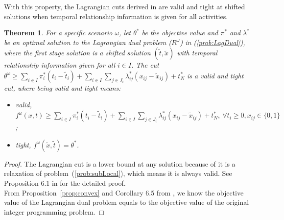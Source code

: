\documentclass[11pt]{article}
\newtheorem{theorem}{Theorem}
\newcommand{\noi}{\noindent}
\begin{document}
	\noi With this property, the Lagrangian cuts derived in \cite{zou2016nested} are valid and tight at shifted solutions when temporal relationship information is given for all activities.
	\begin{theorem}
		For a specific scenario \(\omega\), let \(\theta^*\) be the objective value and \(\pi^*\) and \(\lambda^*\) be an optimal solution to the Lagrangian dual problem (\(R^\omega\)) in (\ref{prob:LagDual}), where the first stage solution is a shifted solution \((\tilde{t},\tilde{x})\) with temporal relationship information given for all \(i \in I\). The cut \(\theta^\omega \geq \sum_{i \in I} \pi_i^* (t_i - \tilde{t}_i) + \sum_{i \in I} \sum_{j \in J_i} \lambda_{ij}^* (x_{ij} - \tilde{x}_{ij}) + t_N^*\) is a valid and tight cut, where being valid and tight means:
		\begin{itemize}
			\item valid, \(f^\omega(x,t) \geq \sum_{i \in I} \pi_i^* (t_i - \tilde{t}_i) + \sum_{i \in I} \sum_{j \in J_i} \lambda_{ij}^* (x_{ij} - \tilde{x}_{ij}) + t_N^*,\ \forall t_i \geq 0, x_{ij} \in \{0,1\}\);
			\item tight, \(f^\omega(\tilde{x},\tilde{t}) = \theta^*\).
		\end{itemize} 
	\end{theorem}
	\begin{proof}
		The Lagrangian cut is a lower bound at any solution because of it is a relaxation of problem~(\ref{prob:subLocal}), which means it is always valid. See Proposition 6.1 in \cite{nemhauser1988integer} for the detailed proof.\\
		\newline
		From Proposition~\ref{prop:convex} and Corollary 6.5 from \cite{nemhauser1988integer}, we know the objective value of the Lagrangian dual problem equals to the objective value of the original integer programming problem.
	\end{proof}
\end{document}
